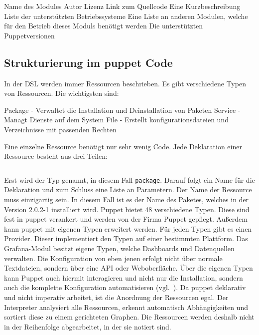 \begin{outline}
  \1 Name des Modules
  \1 Autor
  \1 Lizenz
  \1 Link zum Quellcode
  \1 Eine Kurzbeschreibung
  \1 Liste der unterstützten Betriebssysteme
  \1 Eine Liste an anderen Modulen, welche für den Betrieb dieses Moduls
  benötigt werden
  \1 Die unterstützten Puppetversionen
\end{outline}
\tm%

\subsection{Strukturierung im puppet Code}
In der DSL werden immer Ressourcen beschrieben. Es gibt verschiedene Typen von
Ressourcen. Die wichtigsten sind:

\begin{outline}
  \1 Package - Verwaltet die Installation und Deinstallation von Paketen
  \1 Service - Managt Dienste auf dem System
  \1 File - Erstellt konfigurationsdateien und Verzeichnisse mit passenden
  Rechten
\end{outline}

Eine einzelne Ressource benötigt nur sehr wenig Code. Jede Deklaration einer
Ressource besteht aus drei Teilen:

\begin{center}
   \inputminted{puppet}{../listings/basic-resource.txt}
   \label{lst:puppet-resource}
\end{center}

Erst wird der Typ genannt, in diesem Fall \texttt{package}. Darauf folgt ein
Name für die Deklaration und zum Schluss eine Liste an Parametern. Der Name der
Ressource muss einzigartig sein. In diesem Fall ist es der Name des Paketes,
welches in der Version 2.0.2-1 installiert wird. Puppet bietet 48 verschiedene
Typen. Diese sind fest in puppet verankert und werden von der Firma Puppet
gepflegt. Außerdem kann puppet mit eigenen Typen erweitert werden. Für jeden
Typen gibt es einen Provider. Dieser implementiert den Typen auf einer
bestimmten Plattform. Das Grafana-Modul besitzt eigene Typen, welche Dashboards
und Datenquellen verwalten. Die Konfiguration von eben jenen erfolgt nicht über
normale Textdateien, sondern über eine API oder Weboberfläche. Über die eigenen
Typen kann Puppet auch hiermit interagieren und nicht nur die Installation,
sondern auch die komplette Konfiguration automatisieren
(vgl.~\cite{puppet-resource-types}). Da puppet deklarativ und nicht imperativ
arbeitet, ist die Anordnung der Ressourcen egal. Der Interpreter analysiert
alle Ressourcen, erkennt automatisch Abhängigkeiten und sortiert diese zu einem
gerichteten Graphen. Die Ressourcen werden deshalb nicht in der Reihenfolge
abgearbeitet, in der sie notiert sind.


